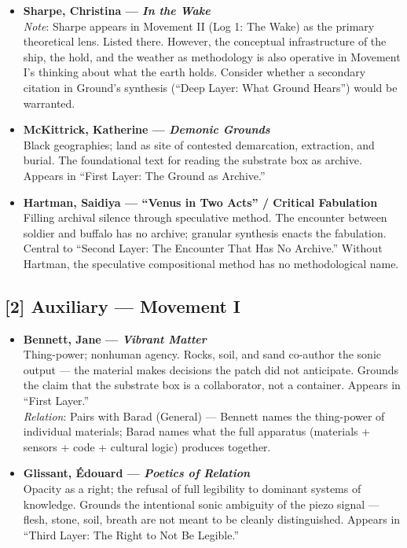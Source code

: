 \begin{itemize}

    \item \textbf{Sharpe, Christina — \textit{In the Wake}} \parencite{Sharpe_2016}\\
    \textit{Note}: Sharpe appears in Movement II (Log 1: The Wake) as the primary theoretical lens. Listed there. However, the conceptual infrastructure of the ship, the hold, and the weather as methodology is also operative in Movement I's thinking about what the earth holds. Consider whether a secondary citation in Ground's synthesis (``Deep Layer: What Ground Hears'') would be warranted.

    \item \textbf{McKittrick, Katherine — \textit{Demonic Grounds}} \parencite{McKittrick_2006}\\
    Black geographies; land as site of contested demarcation, extraction, and burial. The foundational text for reading the substrate box as archive. Appears in ``First Layer: The Ground as Archive.''

    \item \textbf{Hartman, Saidiya — ``Venus in Two Acts'' / Critical Fabulation} \parencite{Hartman_2008}\\
    Filling archival silence through speculative method. The encounter between soldier and buffalo has no archive; granular synthesis enacts the fabulation. Central to ``Second Layer: The Encounter That Has No Archive.'' Without Hartman, the speculative compositional method has no methodological name.

\end{itemize}

\subsection*{[2] Auxiliary — Movement I}

\begin{itemize}

    \item \textbf{Bennett, Jane — \textit{Vibrant Matter}} \parencite{Bennett_2010}\\
    Thing-power; nonhuman agency. Rocks, soil, and sand co-author the sonic output — the material makes decisions the patch did not anticipate. Grounds the claim that the substrate box is a collaborator, not a container. Appears in ``First Layer.''\\
    \textit{Relation}: Pairs with Barad (General) — Bennett names the thing-power of individual materials; Barad names what the full apparatus (materials + sensors + code + cultural logic) produces together.

    \item \textbf{Glissant, Édouard — \textit{Poetics of Relation}} \parencite{Glissant_1997}\\
    Opacity as a right; the refusal of full legibility to dominant systems of knowledge. Grounds the intentional sonic ambiguity of the piezo signal — flesh, stone, soil, breath are not meant to be cleanly distinguished. Appears in ``Third Layer: The Right to Not Be Legible.''

\end{itemize}

